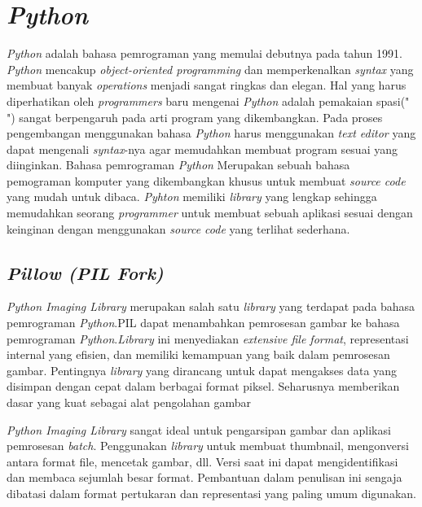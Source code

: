 \section{\textit{Python}}
\label{sec:python}
\textit{Python} adalah bahasa pemrograman yang memulai debutnya pada tahun 1991. \textit{Python} mencakup \textit{object-oriented programming} dan memperkenalkan \textit{syntax} yang membuat banyak \textit{operations} menjadi sangat ringkas dan elegan. Hal yang harus diperhatikan oleh \textit{programmers} baru mengenai \textit{Python} adalah pemakaian spasi(" ") sangat berpengaruh pada arti program yang dikembangkan. Pada proses pengembangan menggunakan bahasa \textit{Python} harus menggunakan \textit{text editor} yang dapat mengenali \textit{syntax}-nya agar memudahkan membuat program sesuai yang diinginkan.
Bahasa pemrograman \textit{Python} Merupakan sebuah bahasa pemograman komputer yang dikembangkan khusus untuk membuat \textit{source code} yang mudah untuk dibaca. \textit{Pyhton} memiliki \textit{library} yang lengkap sehingga memudahkan seorang \textit{programmer} untuk membuat sebuah aplikasi sesuai dengan keinginan dengan menggunakan \textit{source code} yang terlihat sederhana.

\subsection{\textit{Pillow (PIL Fork)}}
\label{subsec:python PIL}
\textit{Python Imaging Library} merupakan salah satu \textit{library} yang terdapat pada bahasa pemrograman \textit{Python}.PIL dapat menambahkan pemrosesan gambar ke bahasa pemrograman \textit{Python}.\textit{Library} ini menyediakan \textit{extensive file format}, representasi internal yang efisien, dan memiliki kemampuan yang baik dalam pemrosesan gambar. Pentingnya \textit{library} yang dirancang untuk dapat mengakses data yang disimpan dengan cepat dalam berbagai format piksel. Seharusnya memberikan dasar yang kuat sebagai alat pengolahan gambar

\textit{Python Imaging Library} sangat ideal untuk pengarsipan gambar dan aplikasi pemrosesan \textit{batch}. Penggunakan \textit{library }untuk membuat thumbnail, mengonversi antara format file, mencetak gambar, dll. Versi saat ini dapat mengidentifikasi dan membaca sejumlah besar format. Pembantuan dalam penulisan ini sengaja dibatasi dalam format pertukaran dan representasi yang paling umum digunakan.

